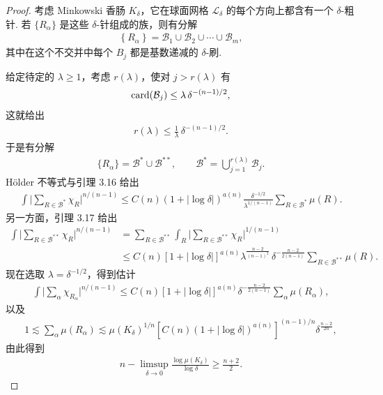 \begin{proof}
考虑 Minkowski 香肠 $K_\delta$，它在球面网格 $\mathcal{L}_\delta$ 的每个方向上都含有一个 $\delta$-粗针. 若 $\{R_\alpha\}$ 是这些 $\delta$-针组成的族，则有分解
\begin{align*}
  \left\{R_{\alpha}\right\}=\mathcal{B}_{1}\cup\mathcal{B}_{2}\cup\cdots\cup\mathcal{B}_{m},
\end{align*}
其中在这个不交并中每个 $B_j$ 都是基数递减的 $\delta$-刷.

给定待定的 $\lambda \geq 1$，考虑 $r(\lambda)$，使对 $j > r(\lambda)$ 有
\begin{align*}
  \operatorname{card}(\mathcal{B}_{j})\leq\lambda\,\delta^{-(n-1)/2},
\end{align*}
这就给出
\begin{align*}
  r(\lambda)\leq\frac{1}{\lambda}\,\delta^{-(n-1)/2}.
\end{align*}
于是有分解
\begin{align*}
  \{R_{\alpha}\}=\mathcal{B}^{*}\cup\mathcal{B}^{**},\qquad
  \mathcal{B}^{*}=\bigcup_{j=1}^{r(\lambda)}\mathcal{B}_{j}.
\end{align*}
Hölder 不等式与引理 3.16 给出
\begin{align*}
  \int\Big|\sum_{R\in\mathcal{B}^{*}}\chi_{R}\Big|^{n/(n-1)}
  \leq C(n)\left(1+|\log\delta|\right)^{a(n)}
  \frac{\delta^{-1/2}}{\lambda^{1/(n-1)}}\sum_{R\in\mathcal{B}^{*}}\mu(R).
\end{align*}
另一方面，引理 3.17 给出
\begin{align*}
  \int\Big|\sum_{R\in\mathcal{B}^{**}}\chi_{R}\Big|^{n/(n-1)}
  &=\sum_{R\in\mathcal{B}^{**}}\int_{R}\Big|\sum_{R\in\mathcal{B}^{**}}\chi_{R}\Big|^{1/(n-1)}\\
  &\leq C(n)[1+|\log\delta|]^{a(n)}
   \lambda^{\frac{n-2}{(n-1)^{2}}}\,\delta^{-\frac{n-2}{2(n-1)}}\sum_{R\in\mathcal{B}^{**}}\mu(R).
\end{align*}
现在选取 $\lambda = \delta^{-1/2}$，得到估计
\begin{align*}
  \int\Big|\sum_{\alpha}\chi_{R_{\alpha}}\Big|^{n/(n-1)}
  \leq C(n)[1+|\log\delta|]^{a(n)}
  \delta^{-\frac{n-2}{2(n-1)}}\sum_{\alpha}\mu(R_{\alpha}),
\end{align*}
以及
\begin{align*}
  1\lesssim\sum_{\alpha}\mu(R_{\alpha})
  \lesssim\mu(K_{\delta})^{1/n}\left[C(n)\left(1+|\log\delta|\right)^{a(n)}\right]^{(n-1)/n}
  \delta^{\frac{n-2}{2n}},
\end{align*}
由此得到
\begin{align*}
  n-\limsup_{\delta\to 0}\frac{\log\mu(K_{\delta})}{\log\delta}\geq\frac{n+2}{2}.
\end{align*}
\end{proof}

